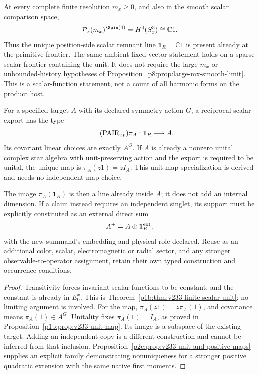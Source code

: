 \documentclass[12pt,a4paper]{article}
\begin{document}
\begin{theorem}
\label{p8:thm:unique-position-remnant-line}
At every complete finite resolution \(m_x\ge0\), and also in the
smooth scalar comparison space,
\[
 \mathcal P_x(m_x)^{\Spin(4)}
 =H^0(S^3_x)\cong\mathbb C1 .
\]
Thus the unique position-side scalar remnant line
\(\mathbf1_R=\mathbb C1\) is present already at the primitive
frontier. The same ambient fixed-vector statement holds on a sparse
scalar frontier containing the unit. It does not require the
large-\(m_x\) or unbounded-history hypotheses of
Proposition~\ref{p8:prop:large-mx-smooth-limit}.
This is a scalar-function statement, not a count of all harmonic
forms on the product host.

For a specified target \(A\) with its declared symmetry action \(G\),
a reciprocal scalar export
has the type
\begin{equation}
\label{p8:eq:PAIRxp-remnant-map}
\tag{PAIR$_{xp}$}
 \pi_A:\mathbf1_R\longrightarrow A.
\end{equation}
Its covariant linear choices are exactly \(A^G\). If \(A\) is
already a nonzero unital complex star algebra with unit-preserving
action and the export is required to be unital, the unique map is
\(\pi_A(z1)=zI_A\). This unit-map specialization is derived and
needs no independent map choice.

The image \(\pi_A(\mathbf1_R)\) is then a line already inside \(A\);
it does not add an internal dimension. If a claim instead requires
an independent singlet, its support must be explicitly constituted
as an external direct sum
\[
 A^+=A\oplus\mathbf1_R^{\rm ext},
\]
with the new summand's embedding and physical role declared.
Reuse as an additional color, scalar, electromagnetic or radial
sector, and any stronger observable-to-operator assignment, retain
their own typed construction and occurrence conditions.
\end{theorem}
\begin{proof}
Transitivity forces invariant scalar functions to be constant,
and the constant is already in \(E_0^x\). This is
Theorem~\ref{p1b:thm:v233-finite-scalar-unit}; no limiting argument
is involved. For the map,
\(\pi_A(z1)=z\pi_A(1)\), and covariance means
\(\pi_A(1)\in A^G\). Unitality fixes \(\pi_A(1)=I_A\), as proved
in Proposition~\ref{p1b:prop:v233-unit-map}. Its image is a subspace
of the existing target. Adding an independent copy is a different
construction and cannot be inferred from that inclusion.
Proposition~\ref{p2c:prop:v233-unit-and-positive-maps} supplies an
explicit family demonstrating nonuniqueness for a stronger positive
quadratic extension with the same native first moments.
\end{proof}
\end{document}
